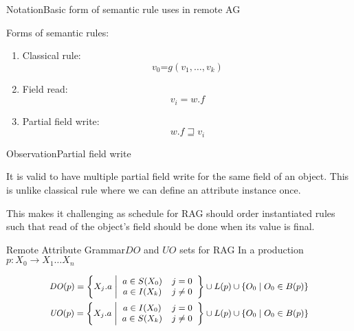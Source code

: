 \begin{frame}{Notation}{Basic form of semantic rule uses in remote AG}

Forms of semantic rules:

\begin{enumerate}
    \item Classical rule: $$v_0 \texttt{=} g(v_1, \dots, v_k) $$
    \item Field read: $$v_i = w.f$$
    \item Partial field write: $$w.f \sqsupseteq v_i$$
\end{enumerate}

\end{frame}


\begin{frame}{Observation}{Partial field write}

It is valid to have \alert{multiple partial field write} for the same field of an object. This is \alert{unlike classical rule} where we can define an attribute instance \alert{once}.

\newlinevspace

This makes it challenging as schedule for RAG should order instantiated rules such that \alert{read of the object's field} should be done when its value is \alert{final}. 

\end{frame}

\begin{frame}{Remote Attribute Grammar}{$\mathit{DO}$ and $\mathit{UO}$ sets for RAG}
In a production $p: X_0 \rightarrow X_1 \dots X_n$

\begin{equation}
\small
\begin{gathered}
\mathit{DO}(p) = \left \{ X_j.a \; \middle\vert
    \begin{array}{cc}
     a \in S(X_0) & j = 0 \\
     a \in I(X_k) & j \neq 0
    \end{array}
\right \} \cup L(p) \cup 
\{ O_0 \mid O_0 \in B(p)  \} \\
\mathit{UO}(p) = \left \{ X_j.a \; \middle\vert
    \begin{array}{cc}
     a \in I(X_0) & j = 0 \\
     a \in S(X_k) & j \neq 0
    \end{array}
\right \} \cup L(p) \cup \{ O_0 \mid O_0 \in B(p)  \}
\end{gathered}
\end{equation}
\end{frame}

